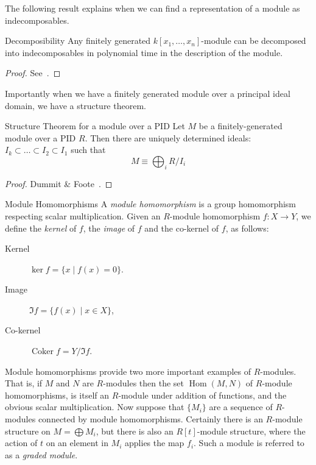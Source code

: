 The following result explains when we can find a representation of a module as indecomposables.
\begin{theorem}{Decomposibility}
Any finitely generated $k[x_1, \ldots, x_n]$-module can be decomposed into indecomposables in polynomial time in the description of the module. 
\end{theorem}
\begin{proof}
See~\cite{caikm-ptafm-1997}.
\end{proof}
Importantly when we have a finitely generated module over a principal ideal domain, we have a structure theorem. 
\begin{theorem}{Structure Theorem for a module over a PID}
Let $M$ be a finitely-generated module over a PID $R$. Then there are uniquely determined ideals:
$I_k \subset \ldots \subset I_2  \subset I_1$ 
such that
\[ M \equiv \bigoplus_i R/I_i \]
\end{theorem}
\begin{proof}
Dummit \& Foote~\cite{dummitnfoote}.
\end{proof}
\begin{definition}{Module Homomorphisms}
A \emph{module homomorphism} is a group homomorphism respecting scalar multiplication. Given an $R$-module homomorphism $f: X \rightarrow Y $, we define the \emph{kernel} of $f$, the \emph{image} of $f$ and the co-kernel of $f$, as follows: 
\begin{description}
\item[Kernel] $\ker{f} = \{ x \mid f(x) = 0 \}$. 
\item[Image] $\Im{f} = \{ f(x) \mid x \in X\}$, 
\item[Co-kernel] $\operatorname{Coker}{f} = Y/\Im{f}$.
\end{description}
\end{definition}

Module homomorphisms provide two more important examples of $R$-modules. That is, if $M$ and $N$ are $R$-modules then the set $\operatorname{Hom}(M,N)$ of $R$-module homomorphisms, is itself an $R$-module under addition of functions, and the obvious scalar multiplication. Now suppose that $\{M_i\}$ are a sequence of $R$-modules connected by module homomorphisms. Certainly there is an $R$-module structure on $M = \bigoplus M_i$, but there is also an $R[t]$-module structure, where the action of $t$ on an element in $M_i$ applies the map $f_i$. Such a module is referred to as a \emph{graded module}.

